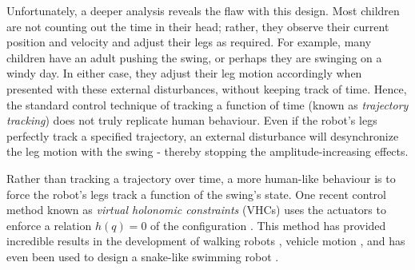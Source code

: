 Unfortunately, a deeper analysis reveals the flaw with this design.
Most children are not counting out the time in their head; rather, they observe
their current position and velocity and adjust their legs as required. 
For example, many children have an adult pushing the swing, or perhaps
they are swinging on a windy day. In either case, they adjust their leg
motion accordingly when presented with these external disturbances, without
keeping track of time. 
Hence, the standard control technique of tracking a function of time (known as
\textit{trajectory tracking}) does not truly replicate human behaviour.
Even if the robot's legs perfectly track a specified trajectory, 
an external disturbance will desynchronize the leg motion
with the swing - thereby stopping the amplitude-increasing effects.


Rather than tracking a trajectory over time, a more human-like behaviour 
is to force the robot's legs track a function of the swing's state. 
One recent control method known as \textit{virtual holonomic constraints} (VHCs)
uses the actuators to enforce a relation \(h(q) = 0\) of the configuration
\cite{vhcs_for_el_systems}. 
This method has provided incredible results in the development of 
walking robots \cite{vhc_robotic_walking, vhc_stable_walking}, 
vehicle motion \cite{vhc_bicycle, vhc_helicopter}, 
and has even been used to design a snake-like swimming robot
\cite{vhc_snake}.

